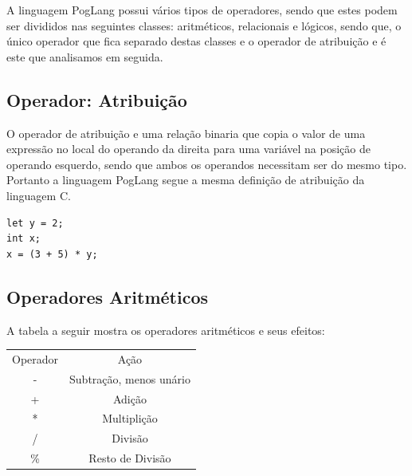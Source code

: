 \documentclass[12pt, letterpaper]{article}
\newcommand\tab[1][1cm]{\hspace*{#1}}
\begin{document}
\tab A linguagem PogLang possui vários tipos de operadores, sendo que estes podem ser divididos nas seguintes classes: 
aritméticos, relacionais e lógicos, sendo que, o único operador que fica separado destas classes e o operador de
atribuição e é este que analisamos em seguida.


\subsection{Operador: Atribuição}
\tab O operador de atribuição e uma relação binaria que copia o valor de uma expressão no local do operando da direita
para uma variável na posição de operando esquerdo, sendo que ambos os operandos necessitam ser do mesmo tipo.\\[1.0mm]
\tab Portanto a linguagem PogLang segue a mesma definição de atribuição da linguagem C.


\begin{spacing}{1.5}
\end{spacing}

\begin{lstlisting}[caption=Exemplos de Atribuição]
let y = 2;
int x;
x = (3 + 5) * y;
\end{lstlisting}

\begin{spacing}{1.5}
\end{spacing}

\subsection{Operadores Aritméticos}
\tab A tabela a seguir mostra os operadores aritméticos e seus efeitos:  

\begin{spacing}{1.5}
\end{spacing}

\begin{center}
\begin{tabular}{c c}
Operador & Ação \\
- & Subtração, menos unário \\
+ & Adição \\
* & Multiplição \\
/ & Divisão \\
\% & Resto de Divisão \\
\end{tabular}
\end{center}

\begin{spacing}{1.5}
\end{spacing}
\end{document}

